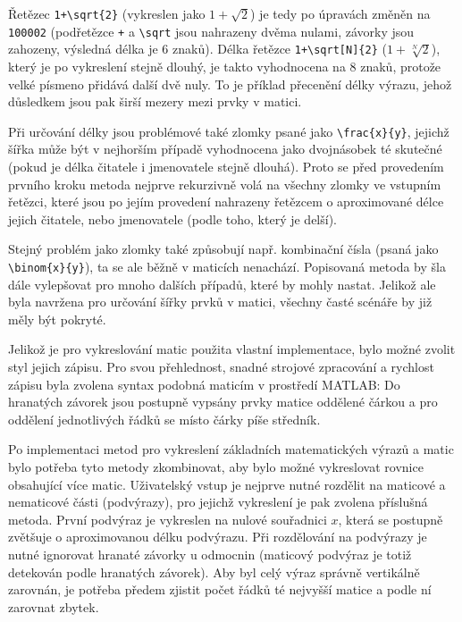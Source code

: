 \documentclass[FM]{tulthesis}
\begin{document}
	Řetězec \verb*|1+\sqrt{2}| (vykreslen jako $1+\sqrt{2}$) je tedy po úpravách změněn na \verb*|100002| (podřetězce \verb*|+| a \verb*|\sqrt| jsou nahrazeny dvěma nulami, závorky jsou zahozeny, výsledná délka je 6 znaků). Délka řetězce \verb*|1+\sqrt[N]{2}| ($1+\sqrt[N]{2}$), který je po vykreslení stejně dlouhý, je takto vyhodnocena na 8 znaků, protože velké písmeno přidává další dvě nuly. To je příklad přecenění délky výrazu, jehož důsledkem jsou pak širší mezery mezi prvky v matici.
	
	Při určování délky jsou problémové také zlomky psané jako \verb*|\frac{x}{y}|, jejichž šířka může být v nejhorším případě vyhodnocena jako dvojnásobek té skutečné (pokud je délka čitatele i jmenovatele stejně dlouhá). Proto se před provedením prvního kroku metoda nejprve rekurzivně volá na všechny zlomky ve vstupním řetězci, které jsou po jejím provedení nahrazeny řetězcem o aproximované délce jejich čitatele, nebo jmenovatele (podle toho, který je delší).

	Stejný problém jako zlomky také způsobují např. kombinační čísla (psaná jako \verb*|\binom{x}{y}|), ta se ale běžně v maticích nenachází. Popisovaná metoda by šla dále vylepšovat pro mnoho dalších případů, které by mohly nastat. Jelikož ale byla navržena pro určování šířky prvků v matici, všechny časté scénáře by již měly být pokryté.

	Jelikož je pro vykreslování matic použita vlastní implementace, bylo možné zvolit styl jejich zápisu. Pro svou přehlednost, snadné strojové zpracování a rychlost zápisu byla zvolena syntax podobná maticím v prostředí MATLAB: Do hranatých závorek jsou postupně vypsány prvky matice oddělené čárkou a pro oddělení jednotlivých řádků se místo čárky píše středník.

	Po implementaci metod pro vykreslení základních matematických výrazů a matic bylo potřeba tyto metody zkombinovat, aby bylo možné vykreslovat rovnice obsahující více matic. Uživatelský vstup je nejprve nutné rozdělit na maticové a nematicové části (podvýrazy), pro jejichž vykreslení je pak zvolena příslušná metoda. První podvýraz je vykreslen na nulové souřadnici $x$, která se postupně zvětšuje o aproximovanou délku podvýrazu. Při rozdělování na podvýrazy je nutné ignorovat hranaté závorky u odmocnin (maticový podvýraz je totiž detekován podle hranatých závorek). Aby byl celý výraz správně vertikálně zarovnán, je potřeba předem zjistit počet řádků té nejvyšší matice a podle ní zarovnat zbytek.
	
\end{document}
